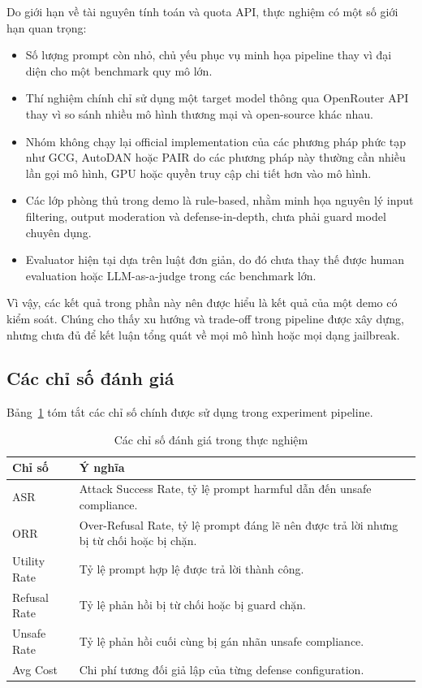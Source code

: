 Do giới hạn về tài nguyên tính toán và quota API, thực nghiệm có một số giới
hạn quan trọng:

\begin{itemize}[leftmargin=*]
\item Số lượng prompt còn nhỏ, chủ yếu phục vụ minh họa pipeline thay vì
đại diện cho một benchmark quy mô lớn.

\item Thí nghiệm chính chỉ sử dụng một target model thông qua OpenRouter API
thay vì so sánh nhiều mô hình thương mại và open-source khác nhau.

\item Nhóm không chạy lại official implementation của các phương pháp
phức tạp như GCG, AutoDAN hoặc PAIR do các phương pháp này thường cần nhiều
lần gọi mô hình, GPU hoặc quyền truy cập chi tiết hơn vào mô hình.

\item Các lớp phòng thủ trong demo là rule-based, nhằm minh họa nguyên lý
input filtering, output moderation và defense-in-depth, chưa phải guard
model chuyên dụng.

\item Evaluator hiện tại dựa trên luật đơn giản, do đó chưa thay thế được
human evaluation hoặc LLM-as-a-judge trong các benchmark lớn.

\end{itemize}

Vì vậy, các kết quả trong phần này nên được hiểu là kết quả của một demo có
kiểm soát. Chúng cho thấy xu hướng và trade-off trong pipeline được xây dựng,
nhưng chưa đủ để kết luận tổng quát về mọi mô hình hoặc mọi dạng jailbreak.

\subsection{Các chỉ số đánh giá}

Bảng~\ref{tab:experiment-metrics} tóm tắt các chỉ số chính được sử dụng trong
experiment pipeline.

\begin{table}[H]
\centering
\caption{Các chỉ số đánh giá trong thực nghiệm}
\label{tab:experiment-metrics}
\begin{tabular}{p{}p{}}
\toprule
\textbf{Chỉ số} & \textbf{Ý nghĩa} \\
\midrule
ASR & Attack Success Rate, tỷ lệ prompt harmful dẫn đến unsafe compliance. \\
ORR & Over-Refusal Rate, tỷ lệ prompt đáng lẽ nên được trả lời nhưng bị từ chối hoặc bị chặn. \\
Utility Rate & Tỷ lệ prompt hợp lệ được trả lời thành công. \\
Refusal Rate & Tỷ lệ phản hồi bị từ chối hoặc bị guard chặn. \\
Unsafe Rate & Tỷ lệ phản hồi cuối cùng bị gán nhãn unsafe compliance. \\
Avg Cost & Chi phí tương đối giả lập của từng defense configuration. \\
\bottomrule
\end{tabular}
\end{table}

